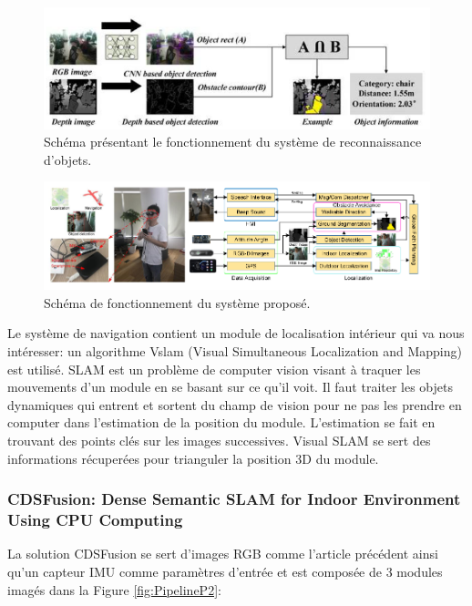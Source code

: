 \documentclass[11pt]{article}
\begin{document}
          \begin{figure}[hbt]  
            \includegraphics[width=\textwidth]{RecognitionP1.png}    
            \caption{Schéma présentant le fonctionnement du système de reconnaissance d'objets.}
            \label{fig:ReconnaissanceP1}
          \end{figure} 

          \begin{figure}[hbt]  
            \includegraphics[width=\textwidth]{PipelineP1.png}    
            \caption{Schéma de fonctionnement du système proposé.}
            \label{fig:PipelineP1}
          \end{figure} 

          Le système de navigation contient un module de localisation intérieur qui va nous intéresser: un algorithme V\acrshort{slam} (Visual Simultaneous 
          Localization and Mapping) est utilisé. SLAM est un problème de computer vision visant à traquer les mouvements d'un module en se basant
          sur ce qu'il voit. Il faut traiter les objets dynamiques qui entrent et sortent du champ de vision pour ne pas les prendre en computer
          dans l'estimation de la position du module. L'estimation se fait en trouvant des points clés sur les images successives.  Visual SLAM
          se sert des informations récuperées pour trianguler la position 3D du module. 
    
        \pagebreak

        \subsubsection{CDSFusion: Dense Semantic SLAM for Indoor Environment Using CPU Computing}
          La solution CDSFusion \cite{wangCDSFusionDenseSemantic2022} se sert d'images RGB comme l'article précédent ainsi qu'un capteur IMU comme paramètres d'entrée et est composée de 
          3 modules imagés dans la Figure \ref{fig:PipelineP2}:
\end{document}
